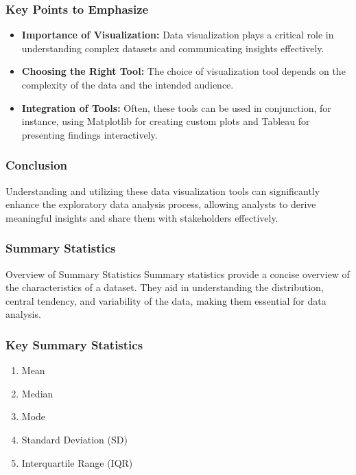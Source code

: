 \documentclass{beamer}
\begin{document}
\begin{frame}
    \frametitle{Key Points to Emphasize}
    \begin{itemize}
        \item \textbf{Importance of Visualization:} Data visualization plays a critical role in understanding complex datasets and communicating insights effectively.
        \item \textbf{Choosing the Right Tool:} The choice of visualization tool depends on the complexity of the data and the intended audience.
        \item \textbf{Integration of Tools:} Often, these tools can be used in conjunction, for instance, using Matplotlib for creating custom plots and Tableau for presenting findings interactively.
    \end{itemize}
\end{frame}

\begin{frame}
    \frametitle{Conclusion}
    Understanding and utilizing these data visualization tools can significantly enhance the exploratory data analysis process, allowing analysts to derive meaningful insights and share them with stakeholders effectively.
\end{frame}

\begin{frame}[fragile]
    \frametitle{Summary Statistics}
    \begin{block}{Overview of Summary Statistics}
        Summary statistics provide a concise overview of the characteristics of a dataset. They aid in understanding the distribution, central tendency, and variability of the data, making them essential for data analysis.
    \end{block}
\end{frame}

\begin{frame}[fragile]
    \frametitle{Key Summary Statistics}
    \begin{enumerate}
        \item Mean
        \item Median
        \item Mode
        \item Standard Deviation (SD)
        \item Interquartile Range (IQR)
    \end{enumerate}
\end{frame}
\end{document}
